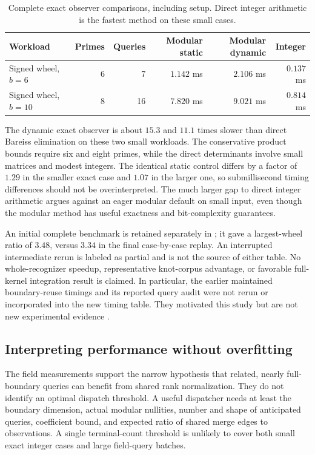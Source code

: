 \documentclass[11pt,letterpaper]{article}
\theoremstyle{definition}\newtheorem{definition}[theorem]{Definition}
\theoremstyle{remark}\newtheorem{remark}[theorem]{Remark}
\newcommand{\code}[1]{\texttt{\detokenize{#1}}}
\begin{document}
\begin{table}[htbp]
\centering
\begin{tabular}{lrrrrr}
\toprule
Workload & Primes & Queries & Modular static & Modular dynamic & Integer\\
\midrule
Signed wheel, $b=6$ & 6 & 7 & $1.142$ ms & $2.106$ ms & $0.137$ ms\\
Signed wheel, $b=10$ & 8 & 16 & $7.820$ ms & $9.021$ ms & $0.814$ ms\\
\bottomrule
\end{tabular}
\caption{Complete exact observer comparisons, including setup. Direct integer arithmetic is the fastest method on these small cases.}
\label{tab:exact}
\end{table}

The dynamic exact observer is about $15.3$ and $11.1$ times slower than direct Bareiss elimination on these two small workloads. The conservative product bounds require six and eight primes, while the direct determinants involve small matrices and modest integers. The identical static control differs by a factor of $1.29$ in the smaller exact case and $1.07$ in the larger one, so submillisecond timing differences should not be overinterpreted. The much larger gap to direct integer arithmetic argues against an eager modular default on small input, even though the modular method has useful exactness and bit-complexity guarantees.

An initial complete benchmark is retained separately in \code{results/benchmark_initial.json}; it gave a largest-wheel ratio of $3.48$, versus $3.34$ in the final case-by-case replay. An interrupted intermediate rerun is labeled as partial and is not the source of either table. No whole-recognizer speedup, representative knot-corpus advantage, or favorable full-kernel integration result is claimed. In particular, the earlier maintained boundary-reuse timings and its reported query audit were not rerun or incorporated into the new timing table. They motivated this study but are not new experimental evidence \cite{boundary}.

\subsection{Interpreting performance without overfitting}
The field measurements support the narrow hypothesis that related, nearly full-boundary queries can benefit from shared rank normalization. They do not identify an optimal dispatch threshold. A useful dispatcher needs at least the boundary dimension, actual modular nullities, number and shape of anticipated queries, coefficient bound, and expected ratio of shared merge edges to observations. A single terminal-count threshold is unlikely to cover both small exact integer cases and large field-query batches.
\end{document}
